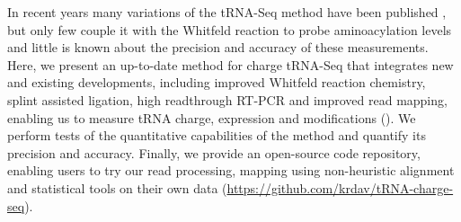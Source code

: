 \documentclass[9pt,lineno]{elife}
\begin{document}
In recent years many variations of the tRNA-Seq method have been published \citep{Wang2021-fc, Zheng2015-kj, Cozen2015-cx, Shigematsu2017-tv, Erber2020-qg, Thomas2021-fi, Lucas2023-vm, Pinkard2020-yd, Warren2021-wt, Yamagami2022-yb}, but only few couple it with the Whitfeld reaction to probe aminoacylation levels \citep{Evans2017-st, Behrens2021-gb, Watkins2022-er} and little is known about the precision and accuracy of these measurements.
Here, we present an up-to-date method for charge tRNA-Seq that integrates new and existing developments, including improved Whitfeld reaction chemistry, splint assisted ligation, high readthrough RT-PCR and improved read mapping, enabling us to measure tRNA charge, expression and modifications ().
We perform tests of the quantitative capabilities of the method and quantify its precision and accuracy.
Finally, we provide an open-source code repository, enabling users to try our read processing, mapping using non-heuristic alignment and statistical tools on their own data (\url{https://github.com/krdav/tRNA-charge-seq}).
\end{document}
